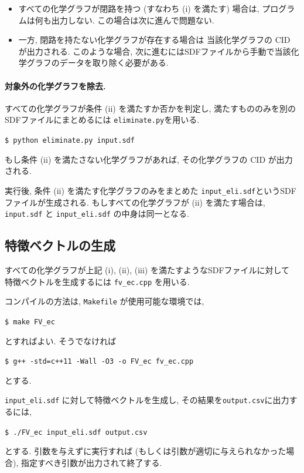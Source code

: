 \documentclass[11pt,titlepage,dvipdfmx,twoside]{jsbook}
\begin{document}
\begin{itemize}
  \item すべての化学グラフが閉路を持つ (すなわち (i) を満たす) 場合は,
    プログラムは何も出力しない. この場合は次に進んで問題ない.
  \item 一方, 閉路を持たない化学グラフが存在する場合は
    当該化学グラフの CID が出力される. このような場合,
    次に進むにはSDFファイルから手動で当該化学グラフのデータを取り除く必要がある. 
\end{itemize}

\paragraph{対象外の化学グラフを除去.}
すべての化学グラフが条件 (ii) を満たすか否かを判定し,
満たすもののみを別のSDFファイルにまとめるには
{\tt eliminate.py}を用いる.

\begin{oframed}
{\small
\verb|$ python eliminate.py input.sdf|
}
\end{oframed}

もし条件 (ii) を満たさない化学グラフがあれば, その化学グラフの CID が出力される.

実行後, 条件 (ii) を満たす化学グラフのみをまとめた
{\tt input\_eli.sdf}というSDFファイルが生成される.
もしすべての化学グラフが (ii) を満たす場合は,
{\tt input.sdf} と {\tt input\_eli.sdf} の中身は同一となる. 


\subsection{特徴ベクトルの生成}
すべての化学グラフが上記 (i), (ii), (iii) を満たすようなSDFファイルに対して
特徴ベクトルを生成するには {\tt fv\_ec.cpp} を用いる.

コンパイルの方法は, {\tt Makefile} が使用可能な環境では, 
\begin{oframed}
{\small
\verb|$ make FV_ec|
}
\end{oframed}
とすればよい. そうでなければ
\begin{oframed}
{\small
\verb|$ g++ -std=c++11 -Wall -O3 -o FV_ec fv_ec.cpp|
}
\end{oframed}
とする.

{\tt input\_eli.sdf} に対して特徴ベクトルを生成し,
その結果を{\tt output.csv}に出力するには,
\begin{oframed}
{\small
\verb|$ ./FV_ec input_eli.sdf output.csv|
}
\end{oframed}
とする. 
引数を与えずに実行すれば (もしくは引数が適切に与えられなかった場合), 
指定すべき引数が出力されて終了する. 
\end{document}
